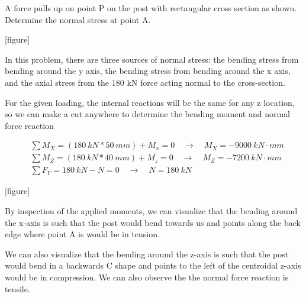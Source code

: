 \documentclass[
  letterpaper,
  DIV=11,
  numbers=noendperiod]{scrreprt}
\theoremstyle{definition}
\theoremstyle{remark}
\begin{document}
\begin{tcolorbox}[enhanced jigsaw, leftrule=.75mm, colbacktitle=quarto-callout-tip-color!10!white, breakable, opacityback=0, colback=white, titlerule=0mm, toprule=.15mm, colframe=quarto-callout-tip-color-frame, coltitle=black, title={Example 14.3}, toptitle=1mm, bottomrule=.15mm, rightrule=.15mm, left=2mm, arc=.35mm, opacitybacktitle=0.6, bottomtitle=1mm]

A force pulls up on point P on the post with rectangular cross section
as shown. Determine the normal stress at point A.

{[}figure{]}

\begin{tcolorbox}[enhanced jigsaw, leftrule=.75mm, colbacktitle=quarto-callout-tip-color!10!white, breakable, opacityback=0, colback=white, titlerule=0mm, toprule=.15mm, colframe=quarto-callout-tip-color-frame, coltitle=black, title={Solution}, toptitle=1mm, bottomrule=.15mm, rightrule=.15mm, left=2mm, arc=.35mm, opacitybacktitle=0.6, bottomtitle=1mm]

In this problem, there are three sources of normal stress: the bending
stress from bending around the y axis, the bending stress from bending
around the x axis, and the axial stress from the 180 kN force acting
normal to the cross-section.

For the given loading, the internal reactions will be the same for any z
location, so we can make a cut anywhere to determine the bending moment
and normal force reaction

\[
\begin{aligned}
&\sum M_X=(180{~kN}*50{~mm})+M_x=0 \quad\rightarrow\quad M_X=-9000{~kN}\cdot{mm} \\
&\sum M_Z=(180{~kN}*40{~mm})+M_z=0 \quad\rightarrow\quad M_Z=-7200{~kN}\cdot{mm} \\
&\sum F_Y=180{~kN}-N=0 \quad\rightarrow\quad N=180{~kN}
\end{aligned}
\]

{[}figure{]}

By inspection of the applied moments, we can visualize that the bending
around the x-axis is such that the post would bend towards us and points
along the back edge where point A is would be in tension.

We can also visualize that the bending around the z-axis is such that
the post would bend in a backwards C shape and points to the left of the
centroidal z-axis would be in compression. We can also observe the the
normal force reaction is tensile.


\end{tcolorbox}
\end{tcolorbox}
\end{document}
